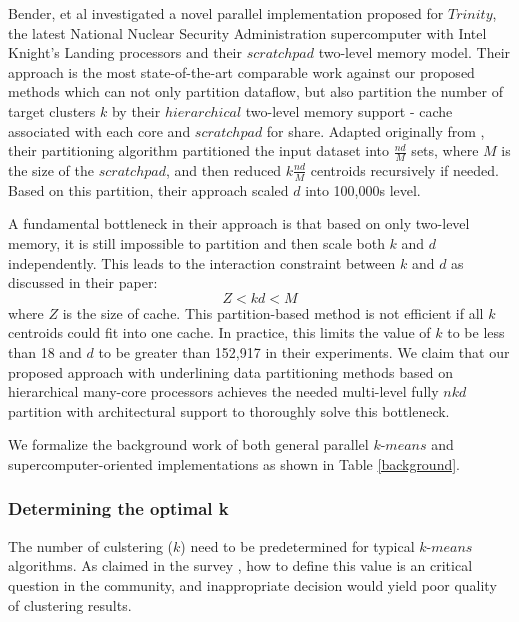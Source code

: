 \documentclass[10pt,journal,compsoc]{IEEEtran}
\begin{document}
Bender, et al \cite{bender2015k} investigated a novel parallel implementation proposed for $Trinity$, the latest National Nuclear Security Administration supercomputer with Intel Knight's Landing processors and their $scratchpad$ two-level memory model. Their approach is the most state-of-the-art comparable work against our proposed methods which can not only partition dataflow, but also partition the number of target clusters $k$ by their $hierarchical$ two-level memory support - cache associated with each core and $scratchpad$ for share. Adapted originally from \cite{guha2003clustering}, their partitioning algorithm partitioned the input dataset into $\frac{nd}{M}$ sets, where $M$ is the size of the $scratchpad$, and then reduced $k\frac{nd}{M}$ centroids recursively if needed. Based on this partition, their approach scaled $d$ into 100,000s level.

A fundamental bottleneck in their approach is that  based on only two-level memory, it is still impossible to partition and then scale both $k$ and $d$ independently. This leads to the interaction constraint between $k$ and $d$ as discussed in their paper: 
$$ Z < kd < M$$
where $Z$ is the size of cache. This partition-based method is not efficient if all $k$ centroids could fit into one cache. In practice, this limits the value of $k$ to be less than 18 and $d$ to be greater than 152,917 in their experiments. We claim that our proposed approach with underlining data partitioning methods based on hierarchical many-core processors achieves the needed multi-level fully $nkd$ partition with architectural support to thoroughly solve this bottleneck. 

We formalize the background work of both general parallel $k$-$means$ and supercomputer-oriented implementations as shown in Table \ref{background}.

\subsubsection{Determining the optimal k}\label{background_J}
The number of culstering ($k$) need to be predetermined for typical $k$-$means$ algorithms. As claimed in the survey \cite{zhang2012review}, how to define this value is an critical question in the community, and inappropriate decision would yield poor quality of clustering results. 
\end{document}
